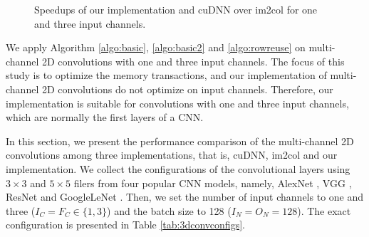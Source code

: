 \begin{figure}
\centering
	

\caption{Speedups of our implementation and cuDNN over im2col for one and three input channels.}
\label{fig:multi2druntime}
\end{figure}


We apply Algorithm \ref{algo:basic}, \ref{algo:basic2} and \ref{algo:rowreuse} on multi-channel 2D convolutions with one and three input channels. The focus of this study is to optimize the memory transactions, and our implementation of multi-channel 2D convolutions do not optimize on input channels. Therefore, our implementation is suitable for convolutions with one and three input channels, which are normally the first layers of a CNN.

In this section, we present the performance comparison of the multi-channel 2D convolutions among three implementations, that is, cuDNN, im2col and our implementation. We collect the configurations of the convolutional layers using $3 \times 3$ and $5 \times 5$ filers from four popular CNN models,
namely, AlexNet \cite{Krizhevsky2012ImageNet}, VGG \cite{SimonyanZ14a}, ResNet \cite{HeZRS16} and GoogleLeNet \cite{SzegedyLJSRAEVR15}.
Then, we set the number of input channels to one and three ($I_C=F_C \in \{1, 3\}$) and the batch size to 128 ($I_N=O_N=128$). The exact configuration is presented in Table \ref{tab:3dconvconfigs}.

